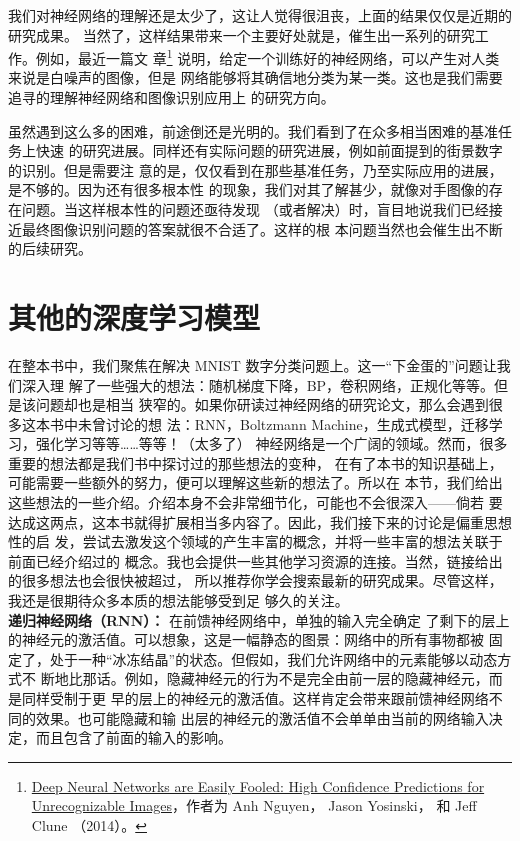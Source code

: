 我们对神经网络的理解还是太少了，这让人觉得很沮丧，上面的结果仅仅是近期的研究成果。
当然了，这样结果带来一个主要好处就是，催生出一系列的研究工作。例如，最近一篇文
章\footnote{\href{http://arxiv.org/abs/1412.1897}{Deep Neural Networks are Easily Fooled: High Confidence Predictions
  for Unrecognizable Images}，作者为 Anh Nguyen， Jason Yosinski， 和 Jeff Clune
  （2014）。} 说明，给定一个训练好的神经网络，可以产生对人类来说是白噪声的图像，但是
网络能够将其确信地分类为某一类。这也是我们需要追寻的理解神经网络和图像识别应用上
的研究方向。

虽然遇到这么多的困难，前途倒还是光明的。我们看到了在众多相当困难的基准任务上快速
的研究进展。同样还有实际问题的研究进展，例如前面提到的街景数字的识别。但是需要注
意的是，仅仅看到在那些基准任务，乃至实际应用的进展，是不够的。因为还有很多根本性
的现象，我们对其了解甚少，就像对手图像的存在问题。当这样根本性的问题还亟待发现
（或者解决）时，盲目地说我们已经接近最终图像识别问题的答案就很不合适了。这样的根
本问题当然也会催生出不断的后续研究。

\section{其他的深度学习模型}
\label{sec:other_approaches_to_deep_neural_nets}

在整本书中，我们聚焦在解决 MNIST 数字分类问题上。这一“下金蛋的”问题让我们深入理
解了一些强大的想法：随机梯度下降，BP，卷积网络，正规化等等。但是该问题却也是相当
狭窄的。如果你研读过神经网络的研究论文，那么会遇到很多这本书中未曾讨论的想
法：RNN，Boltzmann Machine，生成式模型，迁移学习，强化学习等等……等等！（太多了）
神经网络是一个广阔的领域。然而，很多重要的想法都是我们书中探讨过的那些想法的变种，
在有了本书的知识基础上，可能需要一些额外的努力，便可以理解这些新的想法了。所以在
本节，我们给出这些想法的一些介绍。介绍本身不会非常细节化，可能也不会很深入——倘若
要达成这两点，这本书就得扩展相当多内容了。因此，我们接下来的讨论是偏重思想性的启
发，尝试去激发这个领域的产生丰富的概念，并将一些丰富的想法关联于前面已经介绍过的
概念。我也会提供一些其他学习资源的连接。当然，链接给出的很多想法也会很快被超过，
所以推荐你学会搜索最新的研究成果。尽管这样，我还是很期待众多本质的想法能够受到足
够久的关注。\\

\textbf{递归神经网络（RNN）：} 在前馈神经网络中，单独的输入完全确定
了剩下的层上的神经元的激活值。可以想象，这是一幅静态的图景：网络中的所有事物都被
固定了，处于一种“冰冻结晶”的状态。但假如，我们允许网络中的元素能够以动态方式不
断地比那话。例如，隐藏神经元的行为不是完全由前一层的隐藏神经元，而是同样受制于更
早的层上的神经元的激活值。这样肯定会带来跟前馈神经网络不同的效果。也可能隐藏和输
出层的神经元的激活值不会单单由当前的网络输入决定，而且包含了前面的输入的影响。

